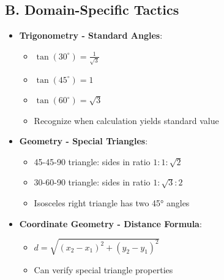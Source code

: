 \documentclass[12pt]{article}
\begin{document}
\begin{tacticalbox}
\subsection*{B. Domain-Specific Tactics}
\begin{itemize}[leftmargin=*]
    \item \textbf{Trigonometry - Standard Angles}:
    \begin{itemize}
        \item $\tan(30^\circ) = \frac{1}{\sqrt{3}}$
        \item $\tan(45^\circ) = 1$
        \item $\tan(60^\circ) = \sqrt{3}$
        \item Recognize when calculation yields standard value
    \end{itemize}
    \item \textbf{Geometry - Special Triangles}:
    \begin{itemize}
        \item 45-45-90 triangle: sides in ratio $1:1:\sqrt{2}$
        \item 30-60-90 triangle: sides in ratio $1:\sqrt{3}:2$
        \item Isosceles right triangle has two 45° angles
    \end{itemize}
    \item \textbf{Coordinate Geometry - Distance Formula}:
    \begin{itemize}
        \item $d = \sqrt{(x_2-x_1)^2 + (y_2-y_1)^2}$
        \item Can verify special triangle properties
    \end{itemize}
\end{itemize}


\end{tacticalbox}
\end{document}
